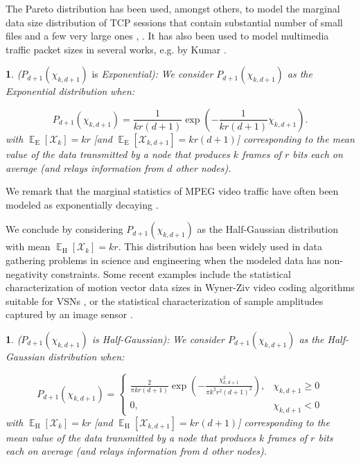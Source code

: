 \documentclass[twocolumn,english]{IEEEtran}
\theoremstyle{plain}
\theoremstyle{definition}
\newtheorem{defn}[thm]{\protect\definitionname}
\newcommand{\E}{\mathop{\mathbb E}}
\providecommand{\definitionname}{Definition}
\providecommand{\definitionname}{Definition}
\begin{document}
The Pareto distribution has been used, amongst others, to model the
marginal data size distribution of TCP sessions that contain substantial
number of small files and a few very large ones \cite{Paxson95wide-areatraffic:},
\cite{Park96onthe}. It has also been used to model multimedia traffic
packet sizes in several works, e.g. by Kumar \cite{Kumar:2003:PTS:1170745.1171535}. 
\begin{defn}
\emph{(}$P_{d+1}(\chi_{k,d+1})$ is \emph{Exponential):} \emph{We
consider $P_{d+1}(\chi_{k,d+1})$ as the Exponential distribution}
\emph{when:}

\emph{
\begin{equation}
P_{d+1}(\chi_{k,d+1})=\frac{1}{kr(d+1)}\exp\left(-\frac{1}{kr(d+1)}\chi_{k,d+1}\right).\label{eq:Exponential PDF definition}
\end{equation}
with }$\E_{\text{E}}[\mathcal{X}_{k}]=kr$ \emph{{[}and }$\E_{\text{E}}[\mathcal{X}_{k,d+1}]=kr\left(d+1\right)$\emph{{]}
corresponding to the mean value of the data transmitted by a node
that produces $k$ frames of $r$ bits each on average (and relays
information from $d$ other nodes).} 
\end{defn}
We remark that the marginal statistics of MPEG video traffic have
often been modeled as exponentially decaying \cite{Dai:2009:UTM:1653034.1653052}.

We conclude by considering $P_{d+1}(\chi_{k,d+1})$ as the Half-Gaussian
distribution with mean $\E_{\text{H}}[\mathcal{X}_{k}]=kr$. This
distribution has been widely used in data gathering problems in science
and engineering when the modeled data has non-negativity constraints.
Some recent examples include the statistical characterization of motion
vector data sizes in Wyner-Ziv video coding algorithms suitable for
VSNs \cite{DBLP:conf/icip/TagliasacchiTS06}, or the statistical characterization
of sample amplitudes captured by an image sensor \cite{LamGoodmanDCT,foo2008analytical,DBLP:journals/tip/AndreopoulosP08}. 
\begin{defn}
\emph{($P_{d+1}(\chi_{k,d+1})$ is Half-Gaussian):} \emph{We consider
$P_{d+1}(\chi_{k,d+1})$ as the Half-Gaussian distribution when:} 
\end{defn}
\emph{
\begin{equation}
P_{d+1}(\chi_{k,d+1})=\begin{cases}
\frac{2}{\pi kr(d+1)}\exp\left(-\frac{\chi_{k,d+1}^{2}}{\pi k^{2}r^{2}(d+1)^{2}}\right), & \chi_{k,d+1}\geq0\\
0, & \chi_{k,d+1}<0
\end{cases}\label{eq:halfgaussain PDF definition}
\end{equation}
with }$\E_{\text{H}}[\mathcal{X}_{k}]=kr$ \emph{{[}and }$\E_{\text{H}}[\mathcal{X}_{k,d+1}]=kr\left(d+1\right)$\emph{{]}
corresponding to the mean value of the data transmitted by a node
that produces $k$ frames of $r$ bits each on average (and relays
information from $d$ other nodes).}
\end{document}
